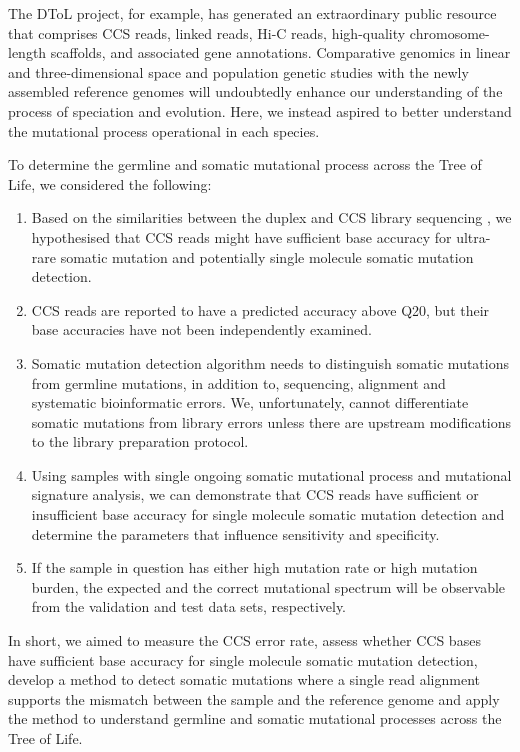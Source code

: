 The DToL project, for example, has generated an extraordinary public resource that comprises CCS reads, linked reads, Hi-C reads, high-quality chromosome-length scaffolds, and associated gene annotations. Comparative genomics in linear and three-dimensional space and population genetic studies with the newly assembled reference genomes will undoubtedly enhance our understanding of the process of speciation and evolution. Here, we instead aspired to better understand the mutational process operational in each species.

To determine the germline and somatic mutational process across the Tree of Life, we considered the following:

\begin{enumerate}
\item Based on the similarities between the duplex\cite{Schmitt2012-yr} and CCS library sequencing \cite{Travers2010-sx}, we hypothesised that CCS reads might have sufficient base accuracy for ultra-rare somatic mutation and potentially single molecule somatic mutation detection.
\item CCS reads are reported to have a predicted accuracy above Q20, but their base accuracies have not been independently examined. 
\item Somatic mutation detection algorithm needs to distinguish somatic mutations from germline mutations, in addition to, sequencing, alignment and systematic bioinformatic errors. We, unfortunately, cannot differentiate somatic mutations from library errors unless there are upstream modifications to the library preparation protocol. 
\item Using samples with single ongoing somatic mutational process and mutational signature analysis, we can demonstrate that CCS reads have sufficient or insufficient base accuracy for single molecule somatic mutation detection and determine the parameters that influence sensitivity and specificity.
\item If the sample in question has either high mutation rate or high mutation burden, the expected and the correct mutational spectrum will be observable from the validation and test data sets, respectively. 
\end{enumerate} 

In short, we aimed to measure the CCS error rate, assess whether CCS bases have sufficient base accuracy for single molecule somatic mutation detection, develop a method to detect somatic mutations where a single read alignment supports the mismatch between the sample and the reference genome and apply the method to understand germline and somatic mutational processes across the Tree of Life. 



